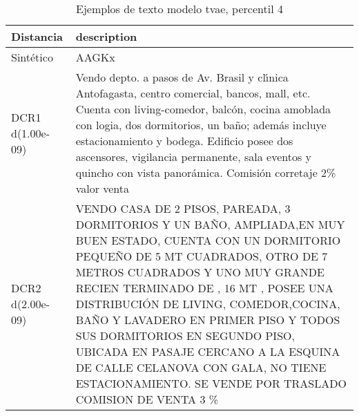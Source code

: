 \begin{table}[H]
\centering
\fontsize{10}{14}\selectfont
\caption{Ejemplos de texto modelo tvae, percentil 4}
\label{table-example-economicos-b-3-tvae-4p-text}
\begin{tabular}{|l|m{35em}|}
\hline
\rowcolor[gray]{0.8}
Distancia & description \\
\hline Sintético & AAGKx \\
\hline DCR1 d(1.00e-09) & Vendo depto. a pasos de Av. Brasil y cl{\'\i}nica Antofagasta, centro comercial, bancos, mall, etc. Cuenta con living-comedor, balc\'on, cocina amoblada con logia, dos dormitorios, un ba\~no; adem\'as incluye estacionamiento y bodega. Edificio posee dos ascensores, vigilancia permanente, sala eventos y quincho con vista panor\'amica. Comisi\'on corretaje 2\% valor venta \\
\hline DCR2 d(2.00e-09) & VENDO CASA DE 2 PISOS, PAREADA, 3 DORMITORIOS Y UN BA\~NO, AMPLIADA,EN MUY BUEN ESTADO, CUENTA CON UN DORMITORIO PEQUE\~NO DE 5 MT CUADRADOS, OTRO DE 7 METROS CUADRADOS Y UNO MUY GRANDE RECIEN TERMINADO DE , 16 MT , POSEE UNA DISTRIBUCI\'ON DE LIVING, COMEDOR,COCINA,  BA\~NO Y LAVADERO EN PRIMER PISO Y TODOS SUS DORMITORIOS EN SEGUNDO PISO, UBICADA EN PASAJE CERCANO A LA ESQUINA DE CALLE CELANOVA CON GALA, NO TIENE ESTACIONAMIENTO. SE VENDE POR TRASLADO
COMISION DE VENTA 3 \%
 \\
\hline
\end{tabular}
\end{table}
